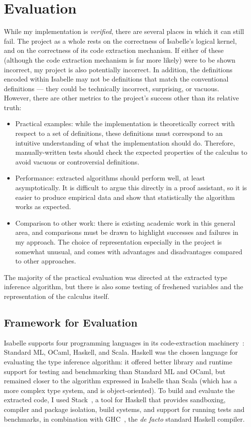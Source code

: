\chapter{Evaluation}
While my implementation is \emph{verified}, there are several places in which it can still fail.
The project as a whole rests on the correctness of Isabelle's logical kernel, and on the correctness of its code extraction mechanism.
If either of these (although the code extraction mechanism is far more likely) were to be shown incorrect, my project is also potentially incorrect.
In addition, the definitions encoded within Isabelle may not be definitions that match the conventional definitions --- they could be technically incorrect, surprising, or vacuous.
However, there are other metrics to the project's success other than its relative truth:
\begin{itemize}
\item
Practical examples: while the implementation is theoretically correct with respect to a set of definitions, these definitions must correspond to an intuitive understanding of what the implementation should do.
Therefore, manually-written tests should check the expected properties of the calculus to avoid vacuous or controversial definitions.
\item
Performance: extracted algorithms should perform well, at least asymptotically.
It is difficult to argue this directly in a proof assistant, so it is easier to produce empirical data and show that statistically the algorithm works as expected.
\item
Comparison to other work: there is existing academic work in this general area, and comparisons must be drawn to highlight successes and failures in my approach.
The choice of representation especially in the project is somewhat unusual, and comes with advantages and disadvantages compared to other approaches.
\end{itemize}

The majority of the practical evaluation was directed at the extracted type inference algorithm, but there is also some testing of freshened variables and the representation of the calculus itself.

\section{Framework for Evaluation}
\label{sec:framework}
Isabelle supports four programming languages in its code-extraction machinery~\cite{codegen-reference}: Standard ML, OCaml, Haskell, and Scala.
Haskell was the chosen language for evaluating the type inference algorithm: it offered better library and runtime support for testing and benchmarking than Standard ML and OCaml, but remained closer to the algorithm expressed in Isabelle than Scala (which has a more complex type system, and is object-oriented).
To build and evaluate the extracted code, I used Stack~\cite{stack}, a tool for Haskell that provides sandboxing, compiler and package isolation, build systems, and support for running tests and benchmarks, in combination with GHC~\cite{GHC}, the \emph{de facto} standard Haskell compiler.

